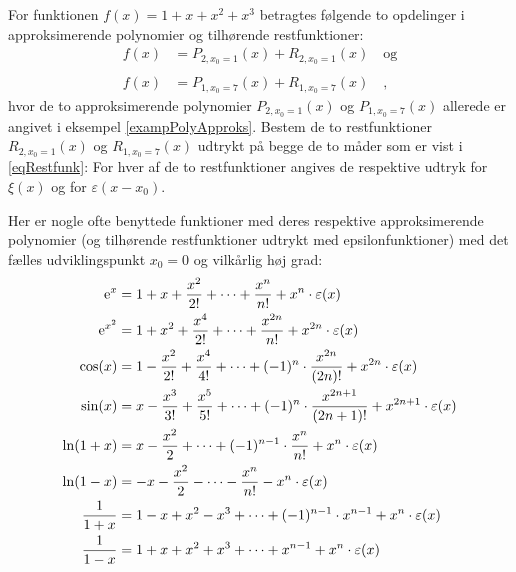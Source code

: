 \begin{exercise}
For funktionen $f(x) =  1 + x + x^{2} + x^{3}$ betragtes følgende to opdelinger i approksimerende polynomier og tilhørende restfunktioner:
\begin{equation}
\begin{aligned}
f(x) &= P_{2, x_{0}=1}(x) + R_{2, x_{0}=1}(x) \quad \textrm{og} \\ \\
f(x) &= P_{1, x_{0}=7}(x) + R_{1, x_{0}=7}(x) \quad,
\end{aligned}
\end{equation}
hvor de to approksimerende polynomier  $P_{2, x_{0}=1}(x)$ og $P_{1, x_{0}=7}(x)$ allerede er angivet i eksempel \ref{exampPolyApproks}. Bestem de to restfunktioner $R_{2, x_{0}=1}(x)$ og $R_{1, x_{0}=7}(x)$ udtrykt på begge de to måder som er vist i  \ref{eqRestfunk}: For hver af de to  restfunktioner angives de respektive udtryk for $\xi(x)$ og for $\varepsilon(x-x_{0})$.
\end{exercise}




\begin{example}[Taylor's grænseformel med udviklingspunkt $x_{0}=0$]\label{exampTaylorGraens}
Her er nogle ofte benyttede funktioner med deres respektive approksimerende polynomier (og tilhørende restfunktioner udtrykt med epsilonfunktioner) med det fælles udviklingspunkt $x_{0}=0$ og vilkårlig høj grad:
\begin{equation}
\begin{aligned}
\mathrm{e}^{x} &= 1 + x + \frac{x^{2}}{2!} + \cdots + \frac{x^{n}}{n!} + x^{n}\cdot\varepsilon(x) \\
\mathrm{e}^{x^{2}} &= 1 + x^{2} + \frac{x^{4}}{2!} + \cdots + \frac{x^{2n}}{n!} + x^{2n}\cdot\varepsilon(x) \\
\cos(x) &= 1 - \frac{x^{2}}{2!} + \frac{x^{4}}{4!} + \cdots + (-1)^{n}\cdot\frac{x^{2n}}{(2n)!} + x^{2n}\cdot\varepsilon(x) \\
\sin(x) &= x - \frac{x^{3}}{3!} +  \frac{x^{5}}{5!}+ \cdots + (-1)^{n}\cdot\frac{x^{2n+1}}{(2n+1)!} + x^{2n+1}\cdot\varepsilon(x)\\
\ln(1+x) &= x - \frac{x^{2}}{2} + \cdots + (-1)^{n-1}\cdot\frac{x^{n}}{n!} + x^{n}\cdot\varepsilon(x) \\
\ln(1-x) &= -x - \frac{x^{2}}{2} - \cdots - \frac{x^{n}}{n!} - x^{n}\cdot\varepsilon(x) \\
\frac{1}{1+x} &= 1 - x +x^{2} - x^{3} + \cdots + (-1)^{n-1}\cdot x^{n-1} + x^{n}\cdot\varepsilon(x) \\
\frac{1}{1-x} &= 1 + x +x^{2} + x^{3} + \cdots +  x^{n-1} + x^{n}\cdot\varepsilon(x)
\end{aligned}
\end{equation}
\end{example}


